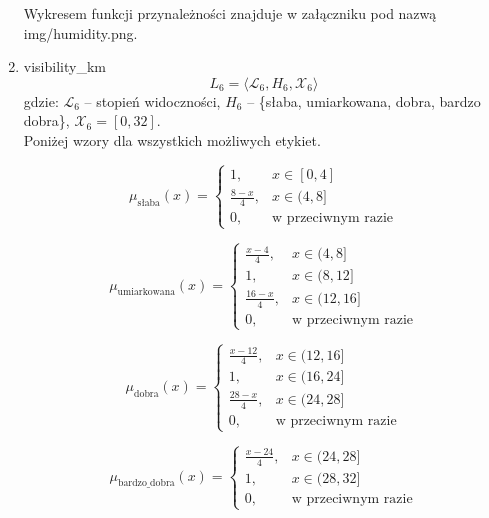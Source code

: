 \documentclass{article}
\begin{document}
\begin{enumerate}
Wykresem funkcji przynależności znajduje w załączniku pod nazwą img/humidity.png.

    \item visibility\_km
    \begin{equation}
            L_6 = \langle \mathcal{L}_6, H_6, \mathcal{X}_6 \rangle
        \end{equation}
        gdzie: $\mathcal{L}_6$ – stopień widoczności, $H_6$ – \{słaba, umiarkowana, dobra, bardzo dobra\}, $\mathcal{X}_6 = [0, 32]$. \\
        Poniżej wzory dla wszystkich możliwych etykiet.
        
    \begin{equation}
    \mu_{\text{słaba}}(x) =
    \begin{cases}
    1, & x \in [0, 4] \\
    \frac{8 - x}{4}, & x \in (4, 8] \\
    0, & \text{w przeciwnym razie}
    \end{cases}
    \end{equation}
    
    \begin{equation}
    \mu_{\text{umiarkowana}}(x) =
    \begin{cases}
    \frac{x - 4}{4}, & x \in (4, 8] \\
    1, & x \in (8, 12] \\
    \frac{16 - x}{4}, & x \in (12, 16] \\
    0, & \text{w przeciwnym razie}
    \end{cases}
    \end{equation}
    
    \begin{equation}
    \mu_{\text{dobra}}(x) =
    \begin{cases}
    \frac{x - 12}{4}, & x \in (12, 16] \\
    1, & x \in (16, 24] \\
    \frac{28 - x}{4}, & x \in (24, 28] \\
    0, & \text{w przeciwnym razie}
    \end{cases}
    \end{equation}

    \begin{equation}
    \mu_{\text{bardzo\_dobra}}(x) =
    \begin{cases}
    \frac{x - 24}{4}, & x \in (24, 28] \\
    1, & x \in (28, 32] \\
    0, & \text{w przeciwnym razie}
    \end{cases}
    \end{equation}


\end{enumerate}
\end{document}
